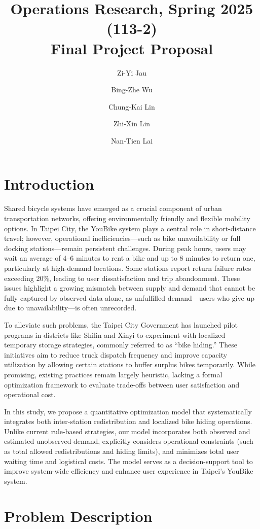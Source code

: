 \documentclass[11pt,a4paper]{article}
\title{Operations Research, Spring 2025 (113-2) \\ Final Project Proposal}
\author{Zi-Yi Jau} %
\author{Bing-Zhe Wu} %
\author{Chung-Kai Lin} %
\author{Zhi-Xin Lin} %
\author{Nan-Tien Lai} %
\affil{Department of Information Management, National Taiwan University}
\begin{document}
\maketitle

\section{Introduction}

Shared bicycle systems have emerged as a crucial component of urban transportation networks, offering environmentally friendly and flexible mobility options. In Taipei City, the YouBike system plays a central role in short-distance travel; however, operational inefficiencies—such as bike unavailability or full docking stations—remain persistent challenges. During peak hours, users may wait an average of 4–6 minutes to rent a bike and up to 8 minutes to return one, particularly at high-demand locations. Some stations report return failure rates exceeding 20\%, leading to user dissatisfaction and trip abandonment. These issues highlight a growing mismatch between supply and demand that cannot be fully captured by observed data alone, as unfulfilled demand—users who give up due to unavailability—is often unrecorded.

To alleviate such problems, the Taipei City Government has launched pilot programs in districts like Shilin and Xinyi to experiment with localized temporary storage strategies, commonly referred to as “bike hiding.” These initiatives aim to reduce truck dispatch frequency and improve capacity utilization by allowing certain stations to buffer surplus bikes temporarily. While promising, existing practices remain largely heuristic, lacking a formal optimization framework to evaluate trade-offs between user satisfaction and operational cost.

In this study, we propose a quantitative optimization model that systematically integrates both inter-station redistribution and localized bike hiding operations. Unlike current rule-based strategies, our model incorporates both observed and estimated unobserved demand, explicitly considers operational constraints (such as total allowed redistributions and hiding limits), and minimizes total user waiting time and logistical costs. The model serves as a decision-support tool to improve system-wide efficiency and enhance user experience in Taipei’s YouBike system.




\section{Problem Description}
\end{document}
